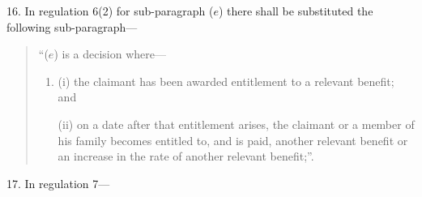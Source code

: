 \documentclass[12pt,a4paper]{article}
\begin{document}
\medskip

16.  In regulation 6(2) for sub-paragraph ($e$)  there shall be substituted the following sub-paragraph—
\begin{quotation}
“($e$) is a decision where—
\begin{enumerate}\item[]
(i) the claimant has been awarded entitlement to a relevant benefit; and

(ii) on a date after that entitlement arises, the claimant or a member of his family becomes entitled to, and is paid, another relevant benefit or an increase in the rate of another relevant benefit;”.
\end{enumerate}
\end{quotation}

\medskip

17.  In regulation 7—
\end{document}
